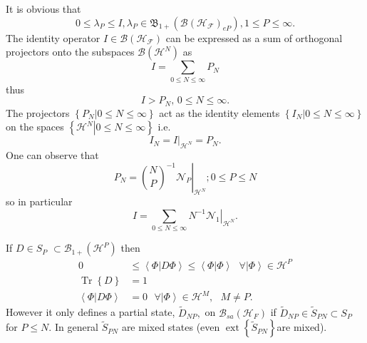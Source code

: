 \documentclass[aps,preprint]{revtex4}%
\begin{document}
It is obvious that
\begin{equation}
0\leq\lambda_{P}\leq I,\lambda_{P}\in\mathfrak{B}_{1+}\left(  \mathcal{B}%
\left(  \mathcal{H}_{\mathcal{F}}\right)  _{eP}\right)  ,1\leq P\leq\infty.
\end{equation}
The identity operator $I\in\mathcal{B}\left(  \mathcal{H}_{\mathcal{F}%
}\right)  $ can be expressed as a sum of orthogonal projectors onto the
subspaces $\mathcal{B}\left(  \mathcal{H}^{N}\right)  $ as%
\begin{equation}
I=\sum_{0\leq N\leq\infty}P_{N}%
\end{equation}
thus
\begin{equation}
I>P_{N},\,0\leq N\leq\infty.
\end{equation}
The projectors $\left\{  \left.  P_{N}\right\vert 0\leq N\leq\infty\right\}  $
act as the identity elements $\left\{  \left.  I_{N}\right\vert 0\leq
N\leq\infty\right\}  $ on the spaces $\left\{  \left.  \mathcal{H}%
^{N}\right\vert 0\leq N\leq\infty\right\}  $ i.e.%
\begin{equation}
I_{N}=\left.  I\right\vert _{\mathcal{H}^{N}}=P_{N}.
\end{equation}
One can observe that
\begin{equation}
P_{N}=\left.  \binom{N}{P}^{-1}\mathcal{N}_{P}\right\vert _{\mathcal{H}^{N}%
};0\leq P\leq N
\end{equation}
so in particular
\begin{equation}
I=\sum_{0\leq N\leq\infty}\left.  N^{-1}\mathcal{N}_{1}\right\vert
_{\mathcal{H}^{N}}.
\end{equation}


If $D\in S_{P}$ $\subset\mathcal{B}_{1+}\left(  \mathcal{H}^{P}\right)  $
then
\begin{align}
0  &  \leq\left\langle \left.  \Phi\right\vert D\Phi\right\rangle
\leq\left\langle \left.  \Phi\right\vert \Phi\right\rangle \text{ }%
\forall\left\vert \Phi\right\rangle \in\mathcal{H}^{P}\\
\operatorname{Tr}\left\{  D\right\}   &  =1\\
\left\langle \left.  \Phi\right\vert D\Phi\right\rangle  &  =0\text{ }%
\forall\left\vert \Phi\right\rangle \in\mathcal{H}^{M},\text{ }M\neq P.
\end{align}
However it only defines a partial state, $\tilde{D}_{NP},$ on $\mathcal{B}%
_{sa}\left(  \mathcal{H}_{F}\right)  $ if $\tilde{D}_{NP}\in\tilde{S}%
_{PN}\subset S_{P}$ for $P\leq N.$ In general $\tilde{S}_{PN}$ are mixed
states (even $\operatorname*{ext}\left\{  \tilde{S}_{PN}\right\}  $are
mixed)$.$
\end{document}

